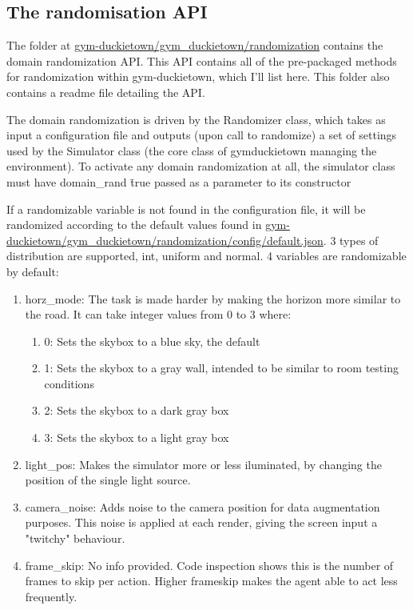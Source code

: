 \subsection{The randomisation API}
The folder at \url{gym-duckietown/gym_duckietown/randomization} contains the domain randomization API. This API contains all of the pre-packaged methods for randomization within gym-duckietown, which I’ll list here. This folder also contains a readme file detailing the API.

The domain randomization is driven by the Randomizer class, which takes as input a configuration file and outputs (upon call to randomize) a set of settings used by the Simulator class (the core class of gym\-duckietown managing the environment). To activate any domain randomization at all, the simulator class must have domain\_rand \= true passed as a parameter to its constructor

If a randomizable variable is not found in the configuration file, it will be randomized according to the default values found in \url{gym-duckietown/gym_duckietown/randomization/config/default.json}. 3 types of distribution are supported, int, uniform and normal. 4 variables are randomizable by default:
\begin{enumerate}
    \item horz\_mode: The task is made harder by making the horizon more similar to the road. It can take integer values from 0 to 3 where:
    \begin{enumerate}
        \item 0: Sets the skybox to a blue sky, the default
        \item 1: Sets the skybox to a gray wall, intended to be similar to room testing conditions
        \item 2: Sets the skybox to a dark gray box
        \item 3: Sets the skybox to a light gray box
    \end{enumerate}
    \item light\_pos: Makes the simulator more or less iluminated, by changing the position of the single light source.
    \item camera\_noise: Adds noise to the camera position for data augmentation purposes. This noise is applied at each render, giving the screen input a "twitchy" behaviour.
    \item frame\_skip: No info provided. Code inspection shows this is the number of frames to skip per action. Higher frameskip makes the agent able to act less frequently.
\end{enumerate}

